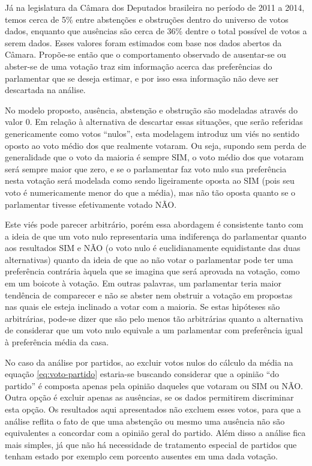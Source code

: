 \documentclass[a4paper, 12pt]{article}
\begin{document}
Já na legislatura da Câmara dos Deputados brasileira no período de 2011 a 2014, temos cerca de 5\% entre abstenções e obstruções dentro do universo de votos dados, enquanto que ausências são cerca de 36\% dentre o total possível de votos a serem dados. Esses valores foram estimados com base nos dados abertos da Câmara. Propõe-se então que o comportamento observado de ausentar-se ou abster-se de uma votação traz sim informação acerca das preferências do parlamentar que se deseja estimar, e por isso essa informação não deve ser descartada na análise.

No modelo proposto, ausência, abstenção e obstrução são modeladas através do valor 0. Em relação à alternativa de descartar essas situações, que serão referidas genericamente como votos ``nulos'', esta modelagem introduz um viés no sentido oposto ao voto médio dos que realmente votaram. Ou seja, supondo sem perda de generalidade que o voto da maioria é sempre SIM, o voto médio dos que votaram será sempre maior que zero, e se o parlamentar faz voto nulo sua preferência nesta votação será modelada como sendo ligeiramente oposta ao SIM (pois seu voto é numericamente menor do que a média), mas não tão oposta quanto se o parlamentar tivesse efetivamente votado NÃO.

Este viés pode parecer arbitrário, porém essa abordagem é consistente tanto com a ideia de que um voto nulo representaria uma indiferença do parlamentar quanto aos resultados SIM e NÃO (o voto nulo é euclidianamente equidistante das duas alternativas) quanto da ideia de que ao não votar o parlamentar pode ter uma preferência contrária àquela que se imagina que será aprovada na votação, como em um boicote à votação. Em outras palavras, um parlamentar teria maior tendência de comparecer e não se abster nem obstruir a votação em propostas nas quais ele esteja inclinado a votar com a maioria. Se estas hipóteses são arbitrárias, pode-se dizer que são pelo menos tão arbitrárias quanto a alternativa de considerar que um voto nulo equivale a um parlamentar com preferência igual à preferência média da casa. 


No caso da análise por partidos, ao excluir votos nulos do cálculo da média na equação \ref{eq:voto-partido} estaria-se buscando considerar que a opinião ``do partido'' é composta apenas pela opinião daqueles que votaram ou SIM ou NÃO. Outra opção é excluir apenas as ausências, se os dados permitirem discriminar esta opção. Os resultados aqui apresentados não excluem esses votos, para que a análise reflita o fato de que uma abstenção ou mesmo uma ausência não são equivalentes a concordar com a opinião geral do partido. Além disso a análise fica mais simples, já que não há necessidade de tratamento especial de partidos que tenham estado por exemplo cem porcento ausentes em uma dada votação.
\end{document}
